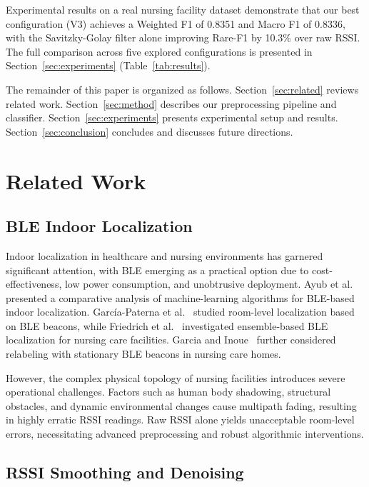 \documentclass{iopconfser}
\begin{document}
Experimental results on a real nursing facility dataset demonstrate that our best configuration (V3) achieves a Weighted F1 of 0.8351 and Macro F1 of 0.8336, with the Savitzky-Golay filter alone improving Rare-F1 by 10.3\% over raw RSSI. The full comparison across five explored configurations is presented in Section~\ref{sec:experiments} (Table~\ref{tab:results}).

The remainder of this paper is organized as follows. Section~\ref{sec:related} reviews related work. Section~\ref{sec:method} describes our preprocessing pipeline and classifier. Section~\ref{sec:experiments} presents experimental setup and results. Section~\ref{sec:conclusion} concludes and discusses future directions.


\section{Related Work}

\subsection{BLE Indoor Localization}

Indoor localization in healthcare and nursing environments has garnered significant attention, with BLE emerging as a practical option due to cost-effectiveness, low power consumption, and unobtrusive deployment. Ayub et al.~\cite{ayub2025} presented a comparative analysis of machine-learning algorithms for BLE-based indoor localization. García-Paterna et al.~\cite{garcia2021} studied room-level localization based on BLE beacons, while Friedrich et al.~\cite{friedrich2024} investigated ensemble-based BLE localization for nursing care facilities. Garcia and Inoue~\cite{garcia2024} further considered relabeling with stationary BLE beacons in nursing care homes.

However, the complex physical topology of nursing facilities introduces severe operational challenges. Factors such as human body shadowing, structural obstacles, and dynamic environmental changes cause multipath fading, resulting in highly erratic RSSI readings. Raw RSSI alone yields unacceptable room-level errors, necessitating advanced preprocessing and robust algorithmic interventions.

\subsection{RSSI Smoothing and Denoising}
\end{document}
